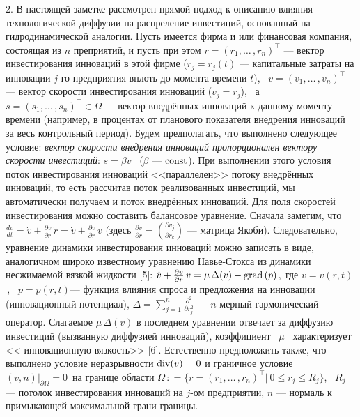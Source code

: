2. В настоящей заметке рассмотрен прямой подход к описанию влияния
технологической диффузии на распреление инвестиций, основанный на
гидродинамической аналогии. Пусть имеется фирма и или финансовая
компания, состоящая из  $n$ преприятий, и пусть при этом
$r=\left(r_1,\dots\,, r_n\right)^\top$ --- вектор инвестирования
инноваций в этой фирме ($r_j = r_j(t)$  --- капитальные затраты на
инновации $j$-го предприятия вплоть до момента времени $t$), \
$v=\left(v_1,\dots\,, v_n\right)^\top$ --- вектор скорости
инвестирования инноваций ($v_j = \dot{r}_j$), \ а
$s=\left(s_1,\dots\,, s_n\right)^\top\in\Omega$ --- вектор
внедрённых инноваций к данному моменту времени (например, в
процентах от планового показателя внедрения инноваций за весь
контрольный период). Будем предполагать, что выполнено следующее
условие: {\em вектор скорости внедрения инноваций пропорционален
вектору скорости инвестиций}: $\dot s = \beta v$ \ ($\beta$ ---
${\rm const}$). При выполнении этого условия поток инвестирования
инноваций <<параллелен>> потоку внедрённых инноваций, то есть
рассчитав поток реализованных инвестиций, мы автоматически получаем
и поток внедрённых инноваций. Для поля скоростей инвестирования
можно составить балансовое уравнение. Сначала заметим, что
 $
\frac{dv}{dt} = \dot{v} + \frac{\partial v}{\partial r}\,\dot{r} =
\dot{v}  + \frac{\partial v}{\partial r}\,v
 $
(здесь $\frac{\partial v}{\partial r} = \left(\frac{\partial
v_j}{\partial r_k}\right)$ --- матрица Якоби). Следовательно,
уравнение динамики инвестирования инноваций можно записать в виде,
аналогичном широко известному уравнению Навье-Стокса из динамики
несжимаемой вязкой жидкости [5]:
 $
\dot{v}  + \frac{\partial v}{\partial r}\,v = \mu \, \Delta(v) -
{\rm grad}\, (p) \,,
 $
где $v = v(r,t)$\,, \ $p = p(r,t)$--- функция влияния спроса и
предложения на инновации (инновационный потенциал), $\Delta =
\sum\limits_{j=1}^n \frac{\partial^2}{\partial r_j^2} $ ---
$n$-мерный гармонический оператор. Слагаемое $\mu \, \Delta(v)$ в
последнем уравнении отвечает за диффузию инвестиций (вызванную
диффузией инноваций), коэффициент \ $\mu$ \ характеризует <<
инновационную вязкость>> [6]. Естественно предположить также, что
выполнено условие неразрывности
 $
{\rm div}(v) = 0
 $
и граничное условие
 $
(v,n)\big |_{\partial \Omega} = 0\,
 $
на границе области $\Omega \,: = \{r =\left(r_1,\dots\,,
r_n\right)^\top\big | \ 0 \leqslant r_j \leqslant R_j\}$, \ $R_j$ --- потолок
инвестирования инноваций на $j$-ом предприятии, $n$ --- нормаль к
примыкающей максимальной грани границы.

